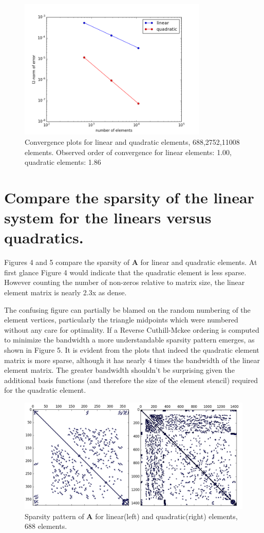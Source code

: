 \documentclass[letterpaper,10pt]{article}
\begin{document}
\begin{figure}[!htb]
\centering
\includegraphics[width=0.8\textwidth]{convergence.PNG}
\caption{Convergence plots for linear and quadratic elements, 688,2752,11008 elements. Observed order of convergence for linear elements: 1.00, quadratic elements: 1.86}
\end{figure}

\section*{Compare the sparsity of the linear system for the linears versus quadratics.}
Figures 4 and 5 compare the sparsity of $\mathbf{A}$ for linear and quadratic elements. At first glance Figure 4 would indicate that the quadratic element is less sparse. However counting the number of non-zeros relative to matrix size, the linear element matrix is nearly 2.3x as dense.

The confusing figure can partially be blamed on the random numbering of the element vertices, particularly the triangle midpoints which were numbered without any care for optimality. If a Reverse Cuthill-Mckee ordering is computed to minimize the bandwidth a more understandable sparsity pattern emerges, as shown in Figure 5. It is evident from the plots that indeed the quadratic element matrix is more sparse, although it has nearly 4 times the bandwidth of the linear element matrix. The greater bandwidth shouldn't be surprising given the additional basis functions (and therefore the size of the element stencil) required for the quadratic element.
\begin{figure}[!htb]
\centering
\includegraphics[width=1\textwidth]{spyLQ.PNG}
\caption{Sparsity pattern of $\mathbf{A}$ for linear(left) and quadratic(right) elements, 688 elements.}
\end{figure}
\end{document}
